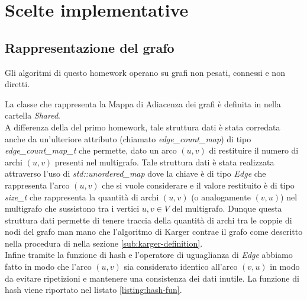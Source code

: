 \section{Scelte implementative}
\label{cap:implementation-choices}

\subsection{Rappresentazione del grafo}
\label{sub:graph-representation}

Gli algoritmi di questo homework operano su grafi non pesati, connessi e non diretti.


\noindent La classe che rappresenta la Mappa di Adiacenza dei grafi è definita in  nella cartella \textit{Shared}.\\

\noindent A differenza della  del primo homework, tale struttura dati è stata corredata anche da un'ulteriore attributo (chiamato \textit{edge\_count\_map}) di tipo \textit{edge\_count\_map\_t} che permette, dato un arco $(u,v)$ di restituire il numero di archi $(u,v)$ presenti nel multigrafo. Tale struttura dati è stata realizzata attraverso l'uso di \textit{std::unordered\_map} dove la chiave è di tipo \textit{Edge} che rappresenta l'arco $(u,v)$ che si vuole considerare e il valore restituito è di tipo \textit{size\_t} che rappresenta la quantità di archi $(u,v)$ (o analogamente $(v,u)$) nel multigrafo che sussistono tra i vertici $u, v \in V$ del multigrafo. Dunque questa struttura dati permette di tenere traccia della quantità di archi tra le coppie di nodi del grafo man mano che l'algoritmo di Karger contrae il grafo come descritto nella procedura di  nella sezione \ref{sub:karger-definition}.\\

\noident Infine tramite la funzione di hash e l'operatore di uguaglianza di \textit{Edge} abbiamo fatto in modo che l'arco $(u,v)$ sia considerato identico all'arco $(v,u)$ in modo da evitare ripetizioni e mantenere una consistenza dei dati inutile. La funzione di hash viene riportato nel listato \ref{listing:hash-fun}.\\

